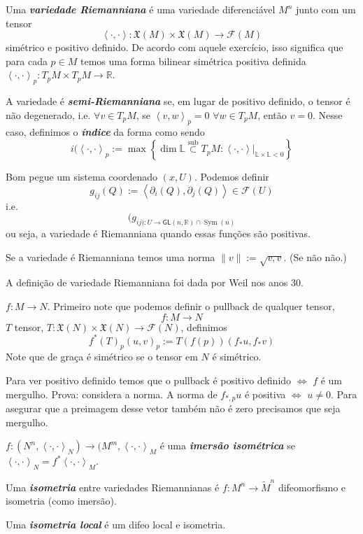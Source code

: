 \begin{defn}\leavevmode
Uma \textit{\textbf{variedade Riemanniana}} é uma variedade diferenciável \(M^n\) junto com um tensor
\[\left<\cdot,\cdot\right>: \mathfrak{X}(M) \times \mathfrak{X}(M) \longrightarrow \mathcal{F}(M)\]
simétrico e positivo definido. De acordo com aquele exercício, isso significa que para cada \(p \in M\) temos uma forma bilinear simétrica positiva definida \(\left<\cdot,\cdot\right>_p:T_pM \times T_pM \longrightarrow \mathbb{R}\).

A variedade é \textit{\textbf{semi-Riemanniana}} se, em lugar de positivo definido, o tensor é não degenerado, i.e. \(\forall v \in T_pM\), se \(\left<v,w\right>_p=0\) \(\forall w \in T_pM\), então \(v =0\). Nesse caso, definimos o \textit{\textbf{índice}} da forma como sendo
\[i(\left<\cdot,\cdot\right>_p:=\operatorname{max}\left\{ \dim \mathbb{L} \overset{\text{sub} }{\subset} T_pM:\left<\cdot,\cdot\right>|_{\mathbb{L}\times\mathbb{L}<0}\right\} \]

Bom pegue um sistema coordenado \((x,U)\). Podemos definir
\[g_{ij}(Q):=\left<\partial_i(Q),\partial_j(Q)\right> \in \mathcal{F}(U)\]
i.e.
\[(g_{ij):U \longrightarrow \mathsf{GL}(n,\mathbb{R}) \cap \operatorname{Sym}(n)}\]
ou seja, a variedade é Riemanniana quando essas funções são positivas.

Se a variedade é Riemanniana temos uma norma \(\|v\|:=\sqrt{v,v} \). (Se não não.)
\end{defn}

\begin{remark}\leavevmode
A definição de variedade Riemanniana foi dada por Weil nos anos 30.
\end{remark}

\begin{defn}[Isometrias]\leavevmode
\(f:M \to N\). Primeiro note que podemos definir o pullback de qualquer tensor,\[f:M \to N\]
\(T\) tensor, \(T: \mathfrak{X}(N)\times \mathfrak{X}(N) \longrightarrow \mathcal{F}(N)\), definimos
\[f^*(T)_p(u,v)_p:=T(f(p))(f_*u,f_*v)\]
Note que de graça é simétrico se o tensor em \(N\) é simétrico.

Para ver positivo definido temos que o pullback é positivo definido \(\iff\) \(f\) é um mergulho. Prova: considera a norma. A norma de \(f_{*,p}u\) é positiva \(\iff\) \(u \neq 0\). Para asegurar que a preimagem desse vetor também  não é zero precisamos que seja mergulho.

\(f:(N^n,\left<\cdot,\cdot\right>_N)\longrightarrow (M^m,\left<\cdot,\cdot\right>_M\) é uma \textit{\textbf{imersão isométrica}} se \(\left<\cdot,\cdot\right>_N = f^*\left<\cdot,\cdot\right>_M\).

Uma \textit{\textbf{isometria}} entre variedades Riemannianas é \(f:M^n \to \tilde{M}^n\) difeomorfismo e isometria (como imersão).

Uma \textit{\textbf{isometria local}} é um difeo local e isometria.
\end{defn}

